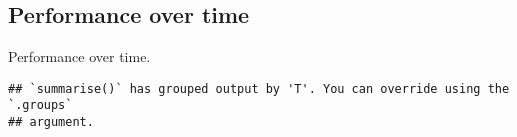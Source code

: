 \documentclass[]{book}
\newenvironment{Shaded}{\begin{snugshade}}{\end{snugshade}}
\newcommand{\DataTypeTok}[1]{\textcolor[rgb]{0.13,0.29,0.53}{#1}}
\newcommand{\KeywordTok}[1]{\textcolor[rgb]{0.13,0.29,0.53}{\textbf{#1}}}
\newcommand{\NormalTok}[1]{#1}
\newcommand{\OperatorTok}[1]{\textcolor[rgb]{0.81,0.36,0.00}{\textbf{#1}}}
\newcommand{\StringTok}[1]{\textcolor[rgb]{0.31,0.60,0.02}{#1}}
\begin{document}
\hypertarget{performance-over-time-5}{%
\subsection{Performance over time}\label{performance-over-time-5}}

Performance over time.

\begin{Shaded}
\end{Shaded}

\begin{verbatim}
## `summarise()` has grouped output by 'T'. You can override using the `.groups`
## argument.
\end{verbatim}
\end{document}
